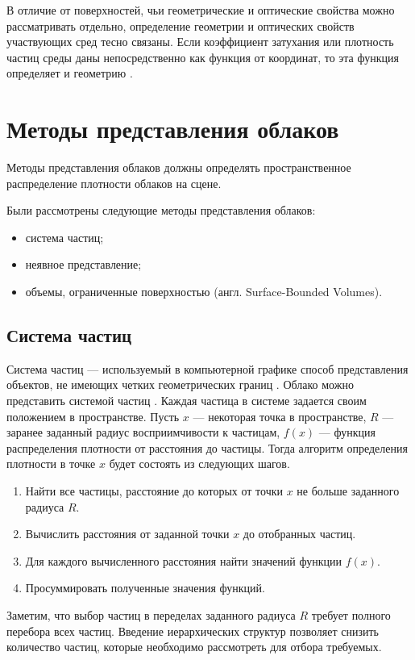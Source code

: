 В отличие от поверхностей, чьи геометрические и оптические свойства можно рассматривать отдельно, определение геометрии и оптических свойств участвующих сред тесно связаны. Если коэффициент затухания или плотность частиц среды даны непосредственно как функция от координат, то эта функция определяет и геометрию \cite{partmedia}.  


\section{Методы представления облаков}
Методы представления облаков должны определять пространственное распределение плотности облаков на сцене.

Были рассмотрены следующие методы представления облаков:
\begin{itemize}
	\item система частиц;
	\item неявное представление;
	\item объемы, ограниченные поверхностью (англ. Surface-Bounded Volumes).
\end{itemize}

\subsection{Система частиц}
\label{particles}
Система частиц --- используемый в компьютерной графике способ представления объектов, не имеющих четких геометрических границ \cite{particles1}. 
Облако можно представить системой частиц \cite{voxel}. Каждая частица в системе задается своим положением в пространстве. Пусть $x$ --- некоторая точка в пространстве, $R$ --- заранее заданный радиус восприимчивости к частицам, $f(x)$ --- функция распределения плотности от расстояния до частицы. Тогда алгоритм определения плотности в точке $x$ будет состоять из следующих шагов.

\begin{enumerate}
	\item Найти все частицы, расстояние до которых от точки $x$ не больше заданного радиуса $R$.
	\item Вычислить расстояния от заданной точки $x$ до отобранных частиц.
	\item Для каждого вычисленного расстояния найти значений функции $f(x)$.
	\item Просуммировать полученные значения функций.
\end{enumerate}

Заметим, что выбор частиц в переделах заданного радиуса $R$ требует полного перебора всех частиц. Введение иерархических структур позволяет снизить количество частиц, которые необходимо рассмотреть для отбора требуемых.


